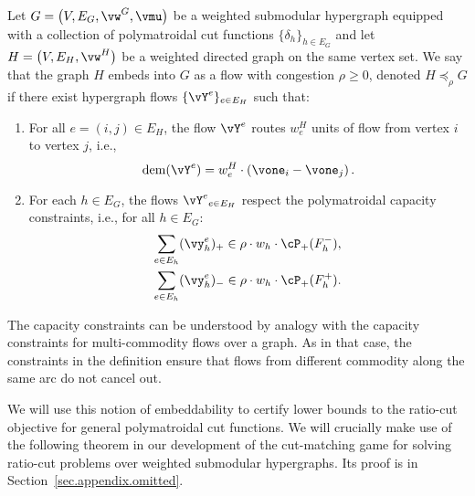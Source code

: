 \documentclass[letterpaper]{article}
\newcommand{\dem}{\operatorname{dem}}
\begin{document}
\begin{definition}
\label{def.flow-embedding}
Let $G = \big( V, E_G, \vw^G, \vmu \big)$ be a weighted submodular hypergraph  equipped with a collection of polymatroidal cut functions $\{ \delta_h \}_{h \in E_G}$ and let  $H = \big( V, E_H, \vw^H \big)$ be a weighted directed graph on the same vertex set.  We say that the graph $H$  embeds into $G$ as a flow with congestion $\rho \geq  0$, denoted $H \preceq_\rho G$ if there exist hypergraph flows $\{\vY^e \}_{e \in E_H}$ such that:
\begin{enumerate}
\item For all $e=(i,j) \in E_H$, the flow $\vY^e$ routes $w^H_{e}$ units of flow from vertex $i$ to vertex $j$, i.e.,
$$
\dem(\vY^e)= w^H_{e} \cdot (\vone_i - \vone_j) \, .
$$
\item For each $h \in E_G$, the flows ${\vY^e}_{e \in E_H}$ respect the polymatroidal capacity constraints, i.e., for all $h \in E_G$:
\begin{align*}
\sum_{e \in E_h} (\vy_h^e)_+ \in \rho \cdot w_h \cdot \cP_+(F_h^-),\\
\sum_{e \in E_h} (\vy_h^e)_- \in \rho \cdot w_h \cdot \cP_+(F_h^+).
\end{align*}
\end{enumerate}
\end{definition}
The capacity constraints can be understood by analogy with the capacity constraints for multi-commodity flows over a graph. As in that case, the constraints in the definition ensure that flows from different commodity along the same arc do not cancel out.

We will use this notion of embeddability  to certify lower bounds to the ratio-cut objective for general polymatroidal cut functions. We will crucially make use of the following theorem in our development of the cut-matching game for solving ratio-cut problems over weighted submodular hypergraphs. Its proof is in Section~\ref{sec.appendix.omitted}.
\end{document}
